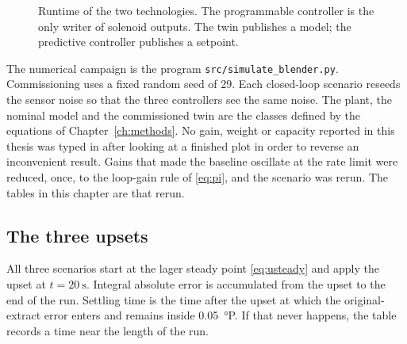 \begin{figure}[htbp]
\centering
{}
\caption{Runtime of the two technologies. The programmable controller is the only writer of solenoid outputs. The twin publishes a model; the predictive controller publishes a setpoint.}
\label{fig:arch}
\end{figure}

The numerical campaign is the program \texttt{src/simulate\_blender.py}. Commissioning uses a fixed random seed of $29$. Each closed-loop scenario reseeds the sensor noise so that the three controllers see the same noise. The plant, the nominal model and the commissioned twin are the classes defined by the equations of Chapter~\ref{ch:methods}. No gain, weight or capacity reported in this thesis was typed in after looking at a finished plot in order to reverse an inconvenient result. Gains that made the baseline oscillate at the rate limit were reduced, once, to the loop-gain rule of \eqref{eq:pi}, and the scenario was rerun. The tables in this chapter are that rerun.

\subsection{The three upsets}

All three scenarios start at the lager steady point \eqref{eq:usteady} and apply the upset at $t=\SI{20}{\second}$. Integral absolute error is accumulated from the upset to the end of the run. Settling time is the time after the upset at which the original-extract error enters and remains inside \SI{0.05}{\degree}P. If that never happens, the table records a time near the length of the run.


